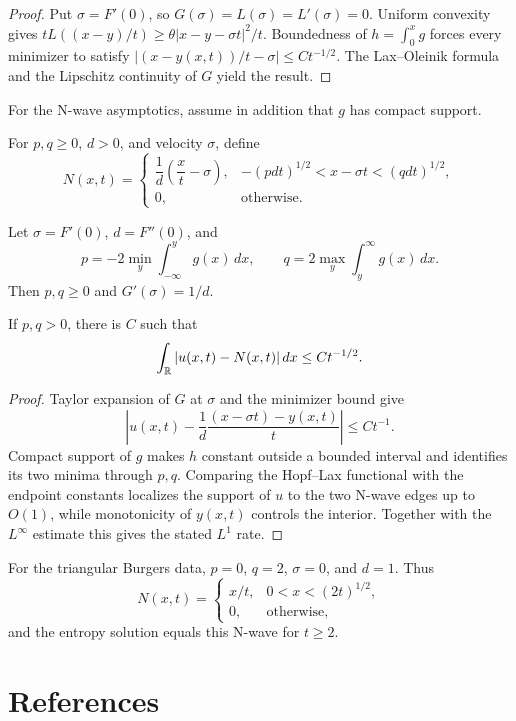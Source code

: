 \begin{proof}
\sketch Put $\sigma=F'(0)$, so $G(\sigma)=L(\sigma)=L'(\sigma)=0$.
Uniform convexity gives
$tL((x-y)/t)\ge\theta|x-y-\sigma t|^2/t$. Boundedness of
$h=\int_0^xg$ forces every minimizer to satisfy
$|(x-y(x,t))/t-\sigma|\le Ct^{-1/2}$. The Lax--Oleinik formula and the
Lipschitz continuity of $G$ yield the result.
\end{proof}

For the N-wave asymptotics, assume in addition that $g$ has compact support.

\begin{definition}[N-wave]
\label{def:n-wave}
For $p,q\ge0$, $d>0$, and velocity $\sigma$, define
\[
N(x,t)=\begin{cases}
\dfrac1d\left(\dfrac{x}{t}-\sigma\right),
&-(pdt)^{1/2}<x-\sigma t<(qdt)^{1/2},\\
0,&\text{otherwise}.
\end{cases}
\]
\end{definition}

Let $\sigma=F'(0)$, $d=F''(0)$, and
\[
p=-2\min_y\int_{-\infty}^y g(x)\,dx,\qquad
q=2\max_y\int_y^\infty g(x)\,dx.
\]
Then $p,q\ge0$ and $G'(\sigma)=1/d$.

\begin{theorem}
\label{thm:asymptotics-l1-norm-n-wave}

If $p,q>0$, there is $C$ such that
\[
\int_{\mathbb{R}}|u(x,t)-N(x,t)|\,dx\le Ct^{-1/2}.
\]
\end{theorem}

\begin{proof}
\sketch Taylor expansion of $G$ at $\sigma$ and the minimizer bound give
\[
\left|u(x,t)-\frac1d\frac{(x-\sigma t)-y(x,t)}{t}\right|\le Ct^{-1}.
\]
Compact support of $g$ makes $h$ constant outside a bounded interval and
identifies its two minima through $p,q$. Comparing the Hopf--Lax functional
with the endpoint constants localizes the support of $u$ to the two N-wave
edges up to $O(1)$, while monotonicity of $y(x,t)$ controls the interior.
Together with the $L^\infty$ estimate this gives the stated $L^1$ rate.
\end{proof}

\begin{example}
\label{ex:burgers-example-n-wave-specialization}

For the triangular Burgers data, $p=0$, $q=2$, $\sigma=0$, and $d=1$.
Thus
\[
N(x,t)=\begin{cases}x/t,&0<x<(2t)^{1/2},\\0,&\text{otherwise},\end{cases}
\]
and the entropy solution equals this N-wave for $t\ge2$.
\end{example}

\section{References}
\label{sec:ch3-references}

\noindent\cite{CourantHilbert1962,Caratheodory1982,Garabedian1964,John1982,Chester1971,Sneddon1957,Zwillinger1984,PLLions1982,Rund1973,Benton1977,Benton1977,Lax1973,Smoller1983,DiPerna1983,Whitham1974}
